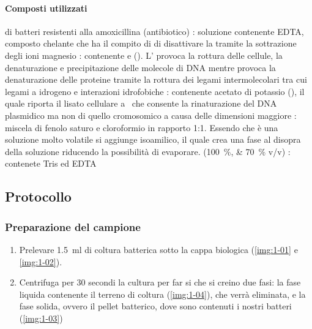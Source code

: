 \paragraph{Composti utilizzati}
\begin{itemize}[person]
	 di batteri resistenti alla amoxicillina (antibiotico)
	\itemb[\slz I]: soluzione contenente EDTA, composto chelante che ha il compito di di disattivare la  tramite la sottrazione degli ioni magnesio 
	\itemb[\slz II]: contenente  e  (). L' provoca la rottura delle cellule, la denaturazione e precipitazione delle molecole di DNA mentre  provoca la denaturazione delle proteine tramite la rottura dei legami intermolecolari tra cui legami a idrogeno e interazioni idrofobiche
	: contenente acetato di potassio (), il quale riporta il lisato cellulare a \pH\ che consente la rinaturazione del DNA plasmidico ma non di quello cromosomico a causa delle dimensioni maggiore  
	: miscela di fenolo saturo e cloroformio in rapporto 1:1. Essendo che è una soluzione molto volatile si aggiunge isoamilico, il quale crea una fase al disopra della soluzione riducendo la possibilità di evaporare. 
	\itemb[Etanolo] (\qtylist{100;70}{\percent} v/v)
	\itemb[\slz di TE]: contenete Tris ed EDTA
\end{itemize}

\subsection{Protocollo}
\subsubsection{Preparazione del campione}
\begin{enumerate}
	\item Prelevare \qty{1.5}{\ml} di coltura batterica sotto la cappa biologica (\autoref{img:1-01} e \ref{img:1-02}).          
	\item Centrifuga per 30 secondi la cultura per far si che si creino due fasi: la fase liquida contenente il terreno di coltura (\autoref{img:1-04}), che verrà eliminata, e la fase solida, ovvero il pellet batterico, dove sono contenuti i nostri batteri (\autoref{img:1-03})            
\end{enumerate}
